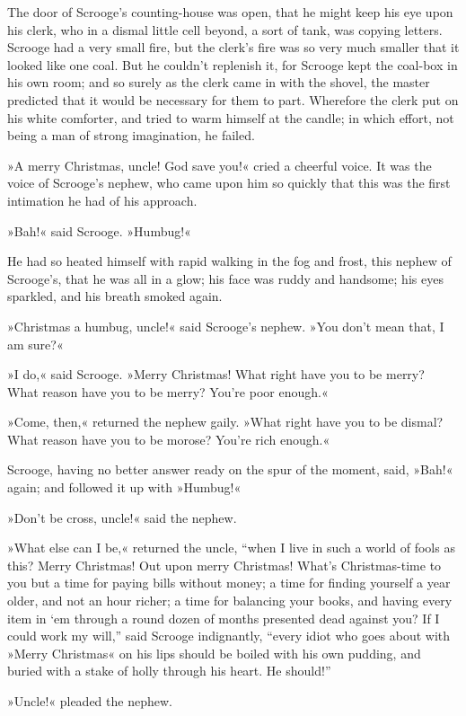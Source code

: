 The door of Scrooge's counting-house was open, that he might keep his eye upon his clerk, who in a dismal little cell beyond, a sort of tank, was copying letters. Scrooge had a very small fire, but the clerk's fire was so very much smaller that it looked like one coal. But he couldn't replenish it, for Scrooge kept the coal-box in his own room; and so surely as the clerk came in with the shovel, the master predicted that it would be necessary for them to part. Wherefore the clerk put on his white comforter, and tried to warm himself at the candle; in which effort, not being a man of strong imagination, he failed.

»A merry Christmas, uncle! God save you!« cried a cheerful voice. It was the voice of Scrooge's nephew, who came upon him so quickly that this was the first intimation he had of his approach.

»Bah!« said Scrooge. »Humbug!«

He had so heated himself with rapid walking in the fog and frost, this nephew of Scrooge's, that he was all in a glow; his face was ruddy and handsome; his eyes sparkled, and his breath smoked again.

»Christmas a humbug, uncle!« said Scrooge's nephew. »You don't mean that, I am sure?«

»I do,« said Scrooge. »Merry Christmas! What right have you to be merry? What reason have you to be merry? You're poor enough.«

»Come, then,« returned the nephew gaily. »What right have you to be dismal? What reason have you to be morose? You're rich enough.«

Scrooge, having no better answer ready on the spur of the moment, said, »Bah!« again; and followed it up with »Humbug!«

»Don't be cross, uncle!« said the nephew.

»What else can I be,« returned the uncle, \enquote{when I live in such a world of fools as this? Merry Christmas! Out upon merry Christmas! What's Christmas-time to you but a time for paying bills without money; a time for finding yourself a year older, and not an hour richer; a time for balancing your books, and having every item in `em through a round dozen of months presented dead against you? If I could work my will,} said Scrooge indignantly, \enquote{every idiot who goes about with »Merry Christmas« on his lips should be boiled with his own pudding, and buried with a stake of holly through his heart. He should!}

»Uncle!« pleaded the nephew.


